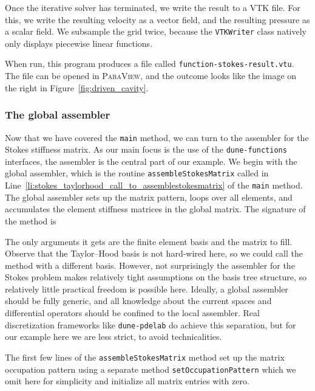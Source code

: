 \documentclass[a4paper,10pt,headings=normal,bibliography=totoc]{scrartcl}
\newcommand{\cpp}[1]{\lstinline[basicstyle=\ttfamily]!#1!}
\newcommand{\program}[1]{\textsc{#1}\xspace}
\newcommand{\dunemodule}[1]{\texttt{#1}}
\newcommand{\file}[1]{\texttt{#1}}
\begin{document}
Once the iterative solver has terminated, we write the result to a VTK file.  For this, we write the resulting velocity as a vector field,
and the resulting pressure as a scalar field.  We subsample the grid twice, because the \cpp{VTKWriter}
class natively only displays piecewise linear functions.
%

%
When run, this program produces a file called \file{function-stokes-result.vtu}.  The file can be opened in
\program{ParaView}, and the outcome looks like the image on the right in Figure~\ref{fig:driven_cavity}.

\subsubsection{The global assembler}

Now that we have covered the \cpp{main} method, we can turn to the assembler for the Stokes stiffness matrix.
As our main focus is the use of the \dunemodule{dune-functions} interfaces, the assembler
is the central part of our example.   We begin with the global assembler,
which is the routine \cpp{assembleStokesMatrix} called in Line~\ref{li:stokes_taylorhood_call_to_assemblestokesmatrix}
of the \cpp{main} method.
The global assembler sets up the matrix pattern, loops over all elements, and accumulates the element stiffness
matrices in the global matrix. The signature of the method is
%

%
The only arguments it gets are the finite element basis and the matrix to fill.  Observe that the Taylor--Hood basis is not
hard-wired here, so we could call the method with a different basis.
However, not surprisingly the assembler for the Stokes problem makes relatively tight assumptions on the basis tree
structure, so relatively little practical freedom is possible here.  Ideally, a global assembler should be fully
generic, and all knowledge about the current spaces and differential operators should be confined to the local
assembler.  Real discretization frameworks like \dunemodule{dune-pdelab} do achieve this separation,
but for our example here we are less strict, to avoid technicalities.

The first few lines of the \cpp{assembleStokesMatrix} method set up the matrix occupation pattern
using a separate method \cpp{setOccupationPattern} which we omit here for simplicity and initialize
all matrix entries with zero.
%

\end{document}
